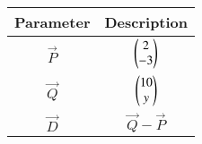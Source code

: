 \begin{tabular}[12pt]{ |c| c|}
    \hline
    Parameter & Description\\ 
    \hline
    $\vec{P}$ & $\begin{pmatrix}2\\-3\end{pmatrix}$ \\
    \hline 
    $\vec{Q}$ & $\begin{pmatrix}10\\y\end{pmatrix}$ \\
	\hline
    $\vec{D}$ & $\vec{Q}-\vec{P}$\\
    \hline 
    \end{tabular}
